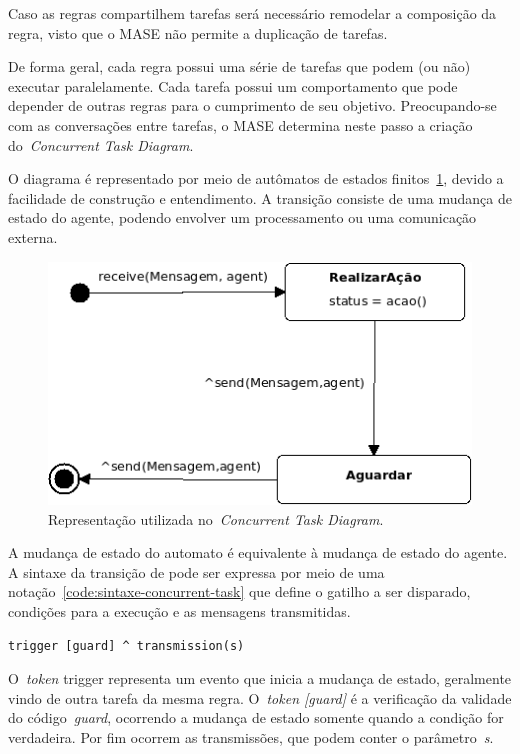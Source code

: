 Caso as regras compartilhem tarefas será necessário remodelar a composição da regra, visto que o MASE não permite a duplicação de tarefas. 

De forma geral, cada regra possui uma série de tarefas que podem (ou não) executar paralelamente. Cada tarefa possui um comportamento que pode depender de outras regras para o cumprimento de seu objetivo. Preocupando-se com as conversações entre tarefas, o MASE determina neste passo a criação do~\emph{Concurrent Task Diagram}.

O diagrama é representado por meio de autômatos de estados finitos~\ref{fig:examplo-diagrama-tarefas-concorrentes}, devido a facilidade de construção e entendimento. A transição consiste de uma mudança de estado do agente, podendo envolver um processamento ou uma comunicação externa.
\begin{figure}
	\centering
	\includegraphics[scale=0.65]{images/examplo-diagrama-tarefas-concorrentes.png}
	\caption{Representação utilizada no~\emph{Concurrent Task Diagram}.}
	\label{fig:examplo-diagrama-tarefas-concorrentes}
\end{figure}

A mudança de estado do automato é equivalente à mudança de estado do agente. A sintaxe da transição de pode ser expressa por meio de uma notação~\ref{code:sintaxe-concurrent-task} que define o gatilho a ser disparado, condições para a execução e as mensagens transmitidas.

\begin{lstlisting}[label=code:sintaxe-concurrent-task,caption=Sintaxe da mudança de estado.]
	trigger [guard] ^ transmission(s)
\end{lstlisting}

O~\emph{token} trigger representa um evento que inicia a mudança de estado, geralmente vindo de outra tarefa da mesma regra. O~\emph{token [guard]} é a verificação da validade do código~\emph{guard}, ocorrendo a mudança de estado somente quando a condição for verdadeira. Por fim ocorrem as transmissões, que podem conter o parâmetro~\emph{s}.

